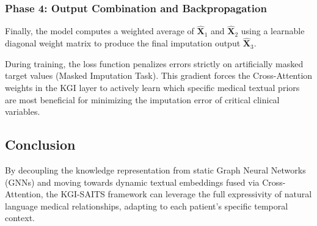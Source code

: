 \subsubsection{Phase 4: Output Combination and Backpropagation}
Finally, the model computes a weighted average of $\mathbf{\hat{X}}_1$ and $\mathbf{\hat{X}}_2$ using a learnable diagonal weight matrix to produce the final imputation output $\mathbf{\hat{X}}_3$. 

During training, the loss function penalizes errors strictly on artificially masked target values (Masked Imputation Task). This gradient forces the Cross-Attention weights in the KGI layer to actively learn which specific medical textual priors are most beneficial for minimizing the imputation error of critical clinical variables.

\subsection{Conclusion}
By decoupling the knowledge representation from static Graph Neural Networks (GNNs) and moving towards dynamic textual embeddings fused via Cross-Attention, the KGI-SAITS framework can leverage the full expressivity of natural language medical relationships, adapting to each patient's specific temporal context.
